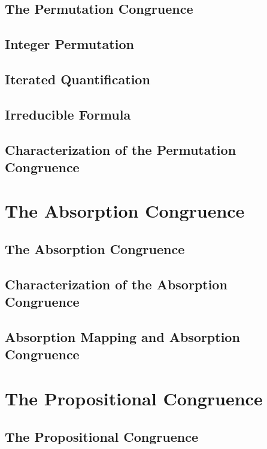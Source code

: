     \subsection{The Permutation Congruence}
      
    \subsection{Integer Permutation}
      
    \subsection{Iterated Quantification}
      
    \subsection{Irreducible Formula}
      
    \subsection{Characterization of the Permutation Congruence}
      
\section{The Absorption Congruence}
    \subsection{The Absorption Congruence}
      
    \subsection{Characterization of the Absorption Congruence}
      
    \subsection{Absorption Mapping and Absorption Congruence}
      
\section{The Propositional Congruence}
    \subsection{The Propositional Congruence}
      

